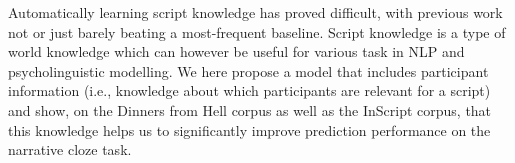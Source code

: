 Automatically learning script knowledge has proved difficult, with previous work not or just barely beating a most-frequent baseline. Script knowledge is a type of world knowledge which can however be useful for various task in NLP and psycholinguistic modelling. We here propose a model that includes participant information (i.e., knowledge about which participants are relevant for a script) and show, on the Dinners from Hell corpus as well as the InScript corpus, that this knowledge helps us to significantly improve prediction performance on the narrative cloze task.
